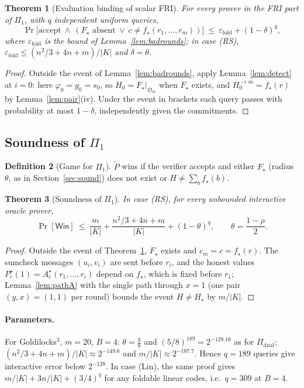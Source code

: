 \documentclass[11pt]{article}
\newtheorem{theorem}{Theorem}[section]
\theoremstyle{definition}
\newtheorem{definition}[theorem]{Definition}
\newcommand{\K}{K}
\newcommand{\Win}{\mathsf{Win}}
\begin{document}
\begin{theorem}[Evaluation binding of scalar FRI]\label{thm:bind}
For every prover in the FRI part of $\Pi_1$, with $q$ independent uniform queries,
\[
\Pr\big[\text{accept}\ \wedge\ (F_\star\text{ absent}\ \vee\ c\ne f_\star(r_1,\dots,r_m))\big]\ \le\ \varepsilon_{\mathrm{fold}}+(1-\delta)^q,
\]
where $\varepsilon_{\mathrm{fold}}$ is the bound of Lemma~\ref{lem:badrounds}; in case (RS), $\varepsilon_{\mathrm{fold}}\le(n^2/3+4n+m)/|\K|$ and $\delta=\theta$.
\end{theorem}
\begin{proof}
Outside the event of Lemma~\ref{lem:badrounds}, apply Lemma~\ref{lem:detect} at $i=0$: here $\varphi_0=g_0=s_0$, so $H_0=F_\star|_{D_m}$ when $F_\star$ exists, and $H_0^{\to m}=f_\star(r)$ by Lemma~\ref{lem:pair}(iv). Under the event in brackets each query passes with probability at most $1-\delta$, independently given the commitments.
\end{proof}

\subsection{Soundness of \texorpdfstring{$\Pi_1$}{Pi\_1}}

\begin{definition}[Game for $\Pi_1$]
$\widetilde P$ wins if the verifier accepts and either $F_\star$ (radius $\theta$, as in Section~\ref{sec:sound}) does not exist or $H\ne\sum_bf_\star(b)$.
\end{definition}

\begin{theorem}[Soundness of $\Pi_1$]\label{thm:one}
In case (RS), for every unbounded interactive oracle prover,
\[
\Pr[\Win]\ \le\ \frac{m}{|\K|}+\frac{n^2/3+4n+m}{|\K|}+(1-\theta)^q,\qquad\theta=\frac{1-\rho}2 .
\]
\end{theorem}
\begin{proof}
Outside the event of Theorem~\ref{thm:bind}, $F_\star$ exists and $c_m=c=f_\star(r)$. The sumcheck messages $(u_i,v_i)$ are sent before $r_i$, and the honest values $P_i^\star(1)=A_i^\star(r_1,\dots,r_i)$ depend on $f_\star$, which is fixed before $r_1$; Lemma~\ref{lem:pathA} with the single path through $x=1$ (one pair $(y,x)=(1,1)$ per round) bounds the event $H\ne H_\star$ by $m/|\K|$.
\end{proof}

\paragraph{Parameters.} For Goldilocks$^3$, $m=20$, $B=4$: $\theta=\frac38$ and $(5/8)^{189}=2^{-128.16}$ as for $\Pi_{\mathrm{dual}}$; $(n^2/3+4n+m)/|\K|\approx2^{-149.6}$ and $m/|\K|\approx2^{-187.7}$. Hence $q=189$ queries give interactive error below $2^{-128}$. In case (Lin), the same proof gives $m/|\K|+3n/|\K|+(3/4)^q$ for any foldable linear codes, i.e.\ $q=309$ at $B=4$.
\end{document}
